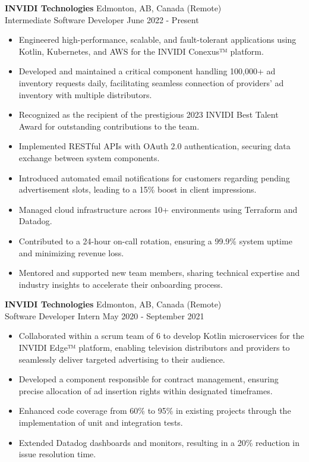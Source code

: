 \documentclass[a4paper]{article}
\begin{document}
\textbf{INVIDI Technologies} \hfill Edmonton, AB, Canada (Remote)\\
Intermediate Software Developer \hfill June 2022 - Present \\
\vspace{-1mm}
\begin{itemize} \itemsep 1pt
    \item Engineered high-performance, scalable, and fault-tolerant applications using Kotlin, Kubernetes, and AWS for the INVIDI Conexus™ platform.
    \item Developed and maintained a critical component handling 100,000+ ad inventory requests daily, facilitating seamless connection of providers' ad inventory with multiple distributors.
    \item Recognized as the recipient of the prestigious 2023 INVIDI Best Talent Award for outstanding contributions to the team.
    \item Implemented RESTful APIs with OAuth 2.0 authentication, securing data exchange between system components.
	\item Introduced automated email notifications for customers regarding pending advertisement slots, leading to a 15\% boost in client impressions.
    \item Managed cloud infrastructure across 10+ environments using Terraform and Datadog.
    \item Contributed to a 24-hour on-call rotation, ensuring a 99.9\% system uptime and minimizing revenue loss.
    \item Mentored and supported new team members, sharing technical expertise and industry insights to accelerate their onboarding process.
\end{itemize}
\vspace{1mm}

\textbf{INVIDI Technologies} \hfill Edmonton, AB, Canada (Remote)\\
Software Developer Intern \hfill May 2020 - September 2021\\
\vspace{-1mm}
\begin{itemize} \itemsep 1pt
    \item Collaborated within a scrum team of 6 to develop Kotlin microservices for the INVIDI Edge™ platform, enabling television distributors and providers to seamlessly deliver targeted advertising to their audience.
    \item Developed a component responsible for contract management, ensuring precise allocation of ad insertion rights within designated timeframes.
	\item Enhanced code coverage from 60\% to 95\% in existing projects through the implementation of unit and integration tests.
	\item Extended Datadog dashboards and monitors, resulting in a 20\% reduction in issue resolution time.
\end{itemize}
\end{document}
